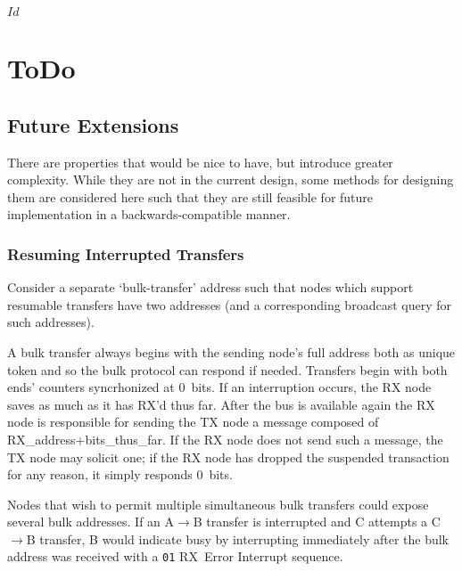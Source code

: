 \svnInfo $Id$

\section{ToDo}
\label{sec:todo}

\subsection{Future Extensions}
\label{sec:todo-extensions}
There are properties that would be nice to have, but introduce greater
complexity. While they are not in the current design, some methods for
designing them are considered here such that they are still feasible for
future implementation in a backwards-compatible manner.

\subsubsection{Resuming Interrupted Transfers}
\label{sec:todo-extensions-resume}
Consider a separate `bulk-transfer' address such that nodes which support
resumable transfers have two addresses (and a corresponding broadcast query
for such addresses).

A bulk transfer always begins with the sending node's full address both as
unique token and so the bulk protocol can respond if needed. Transfers begin
with both ends' counters syncrhonized at 0~bits. If an interruption occurs,
the RX node saves as much as it has RX'd thus far. After the bus is available
again the RX node is responsible for sending the TX node a message composed of
RX\_address+bits\_thus\_far. If the RX node does not send such a message, the
TX node may solicit one; if the RX node has dropped the suspended transaction
for any reason, it simply responds 0~bits.

Nodes that wish to permit multiple simultaneous bulk transfers could expose
several bulk addresses. If an A$\rightarrow$B transfer is interrupted and C
attempts a C$\rightarrow$B transfer, B would indicate busy by interrupting
immediately after the bulk address was received with a {\tt 01} RX~Error
Interrupt sequence.
